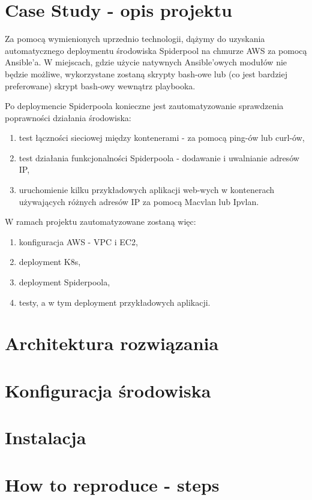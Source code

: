 \documentclass[onecolumn,12pt]{article}
\begin{document}
\section{Case Study - opis projektu}
Za pomocą wymienionych uprzednio technologii, dążymy do uzyskania automatycznego deploymentu środowiska Spiderpool na chmurze AWS za pomocą Ansible'a.
W miejscach, gdzie użycie natywnych Ansible'owych modułów nie będzie możliwe, wykorzystane zostaną skrypty bash-owe lub (co jest bardziej preferowane) skrypt bash-owy wewnątrz playbooka.

Po deploymencie Spiderpoola konieczne jest zautomatyzowanie sprawdzenia poprawności działania środowiska:
\begin{enumerate}
    \item test łączności sieciowej między kontenerami - za pomocą ping-ów lub curl-ów,
    \item test działania funkcjonalności Spiderpoola - dodawanie i uwalnianie adresów IP,
    \item uruchomienie kilku przykładowych aplikacji web-wych w kontenerach używających różnych adresów IP za pomocą Macvlan lub Ipvlan.
\end{enumerate}

W ramach projektu zautomatyzowane zostaną więc:
\begin{enumerate}
    \item konfiguracja AWS - VPC i EC2,
    \item deployment K8s,
    \item deployment Spiderpoola,
    \item testy, a w tym deployment przykładowych aplikacji.
\end{enumerate}

\section{Architektura rozwiązania}


\section{Konfiguracja środowiska}

\section{Instalacja}

\section{How to reproduce - steps}
\end{document}
